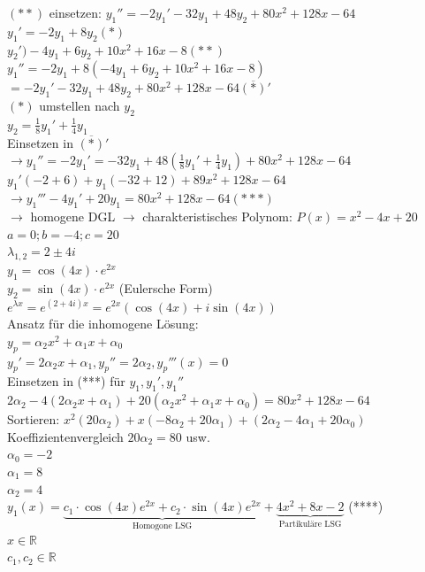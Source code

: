 \documentclass[fontset=ubuntu,12pt,a4paper,fleqn]{article}
\begin{document}
\begin{multicols}{2}
	\((**)\) einsetzen: \({y_1}'' = -2{y_1}'-32y_1+48y_2+80x^2+128x-64\) \\
	\( y_1'=-2y_1+8y_2 (*) \) \\
	\(y_2')-4y_1+6y_2+10x^2+16x-8 (**) \) \\
	\( y_1''=-2y_1+8(-4y_1+6y_2+10x^2+16x-8) \) \\
	\( =-2y_1'-32y_1+48y_2+80x^2+128x-64  \overline{(*)}' \) \\
	\( (*) \) umstellen nach \( y_2 \) \\ 
	\( y_2=\frac{1}{8}y_1'+\frac{1}{4}y_1 \) \\
	Einsetzen in \( \overline{(*)}' \) \\
	\( \rightarrow y_1''=-2y_1'=-32y_1+48(\frac{1}{8}y_1'+\frac{1}{4}y_1) + 80x^2+128x-64 \) \\
	\(y_1'(-2+6)+y_1(-32+12)+89x^2+128x-64 \) \\
	\(\rightarrow y_1'''-4y_1'+20y_1=80x^2+128x-64 (***) \) \\
	\(\rightarrow \) homogene DGL \(\rightarrow \) charakteristisches Polynom: \(P(x)=x^2-4x+20 \) \\
	\(a=0; b=-4;c=20\) \\
	\(\lambda_{1,2}=2\pm4i \) \\
	\(y_1=\cos(4x)\cdot e^{2x} \) \\
	\(y_2=\sin(4x)\cdot e^{2x} \) (Eulersche Form)\\
	\(e^{\lambda x}=e^{(2+4i)x}=e^{2x}(\cos(4x)+i\sin(4x)) \) \\
	Ansatz für die inhomogene Lösung: \\
	\(y_p=\alpha_2x^2+\alpha_1x+\alpha_0 \) \\
	\(y_p'=2\alpha_2x+\alpha_1, y_p''=2\alpha_2, y_p'''(x)=0 \) \\
	Einsetzen in (***) für \(y_1, y_1', y_1''\) \\
	\( 2\alpha_2-4(2\alpha_2x+\alpha_1)+20(\alpha_2x^2+\alpha_1x+\alpha_0) = 80x^2+128x-64 \) \\
	Sortieren: \(x^2(20\alpha_2)+x(-8\alpha_2+20\alpha_1)+(2\alpha_2-4\alpha_1+20\alpha_0)\)
	\\ Koeffizientenvergleich \(20\alpha_2 = 80 \) usw. \\
	\(\alpha_0=-2 \)\\
	\(\alpha_1=8 \)\\
	\(\alpha_2=4 \)\\
	\( y_1(x)=\underbrace{c_1\cdot\cos(4x)e^{2x}+c_2\cdot\sin(4x)e^{2x}}_{\text{Homogone LSG}}+\underbrace{4x^2+8x-2}_{\text{Partikuläre LSG}}\)  (****) \\ \(x\in\mathbb{R}\) \\ \(c_1,c_2\in\mathbb{R}\) \\

\end{multicols}
\end{document}
